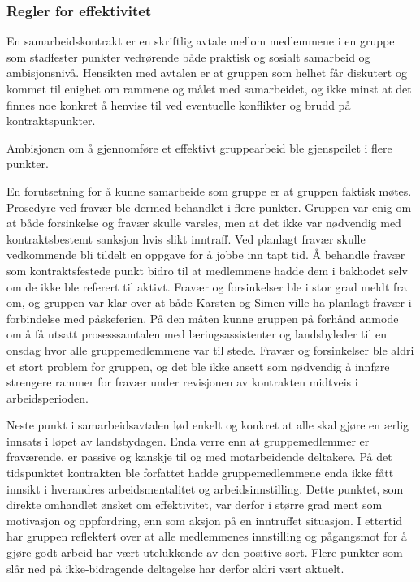 \subsubsection{Regler for effektivitet}
En samarbeidskontrakt er en skriftlig avtale mellom medlemmene i en gruppe som stadfester punkter vedrørende både praktisk og sosialt samarbeid og ambisjonsnivå. 
Hensikten med avtalen er at gruppen som helhet får diskutert og kommet til enighet om rammene og målet med samarbeidet, og ikke minst at det finnes noe konkret å henvise til ved eventuelle konflikter og brudd på kontraktspunkter. 


Ambisjonen om å gjennomføre et effektivt gruppearbeid ble gjenspeilet i flere punkter. 

En forutsetning for å kunne samarbeide som gruppe er at gruppen faktisk møtes. 
Prosedyre ved fravær ble dermed behandlet i flere punkter. 
Gruppen var enig om at både forsinkelse og fravær skulle varsles, men at det ikke var nødvendig med kontraktsbestemt sanksjon hvis slikt inntraff. 
Ved planlagt fravær skulle vedkommende bli tildelt en oppgave for å jobbe inn tapt tid. 
Å behandle fravær som kontraktsfestede punkt bidro til at medlemmene hadde dem i bakhodet selv om de ikke ble referert til aktivt.
Fravær og forsinkelser ble i stor grad meldt fra om, og gruppen var klar over at både Karsten og Simen ville ha planlagt fravær i forbindelse med påskeferien. 
På den måten kunne gruppen på forhånd anmode om å få utsatt prosesssamtalen med læringsassistenter og landsbyleder til en onsdag hvor alle gruppemedlemmene var til stede.
Fravær og forsinkelser ble aldri et stort problem for gruppen, og det ble ikke ansett som nødvendig å innføre strengere rammer for fravær under revisjonen av kontrakten midtveis i arbeidsperioden. 

Neste punkt i samarbeidsavtalen lød enkelt og konkret at alle skal gjøre en ærlig innsats i løpet av landsbydagen.
Enda verre enn at gruppemedlemmer er fraværende, er passive og kanskje til og med motarbeidende deltakere.
På det tidspunktet kontrakten ble forfattet hadde gruppemedlemmene enda ikke fått innsikt i hverandres arbeidsmentalitet og arbeidsinnstilling.
Dette punktet, som direkte omhandlet ønsket om effektivitet, var derfor i større grad ment som motivasjon og oppfordring, enn som aksjon på en inntruffet situasjon.
I ettertid har gruppen reflektert over at alle medlemmenes innstilling og pågangsmot for å gjøre godt arbeid har vært utelukkende av den positive sort.
Flere punkter som slår ned på ikke-bidragende deltagelse har derfor aldri vært aktuelt.

